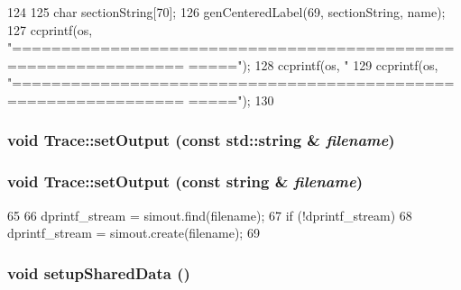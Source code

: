 \begin{DoxyCode}
124 {
125     char sectionString[70];
126     genCenteredLabel(69, sectionString, name);
127     ccprintf(os, "===============================================================
      =====\n");
128     ccprintf(os, "%
129     ccprintf(os, "===============================================================
      =====\n");
130 }
\end{DoxyCode}
\hypertarget{namespaceTrace_a328abf4c8a23042eb4edd3b0807b81ab}{
\subsubsection[{setOutput}]{\setlength{\rightskip}{0pt plus 5cm}void Trace::setOutput (const std::string \& {\em filename})}}
\label{namespaceTrace_a328abf4c8a23042eb4edd3b0807b81ab}
\hypertarget{namespaceTrace_ae05e11a017b6a616b42b8466c09a5dd1}{
\subsubsection[{setOutput}]{\setlength{\rightskip}{0pt plus 5cm}void Trace::setOutput (const string \& {\em filename})}}
\label{namespaceTrace_ae05e11a017b6a616b42b8466c09a5dd1}



\begin{DoxyCode}
65 {
66     dprintf_stream = simout.find(filename);
67     if (!dprintf_stream)
68         dprintf_stream = simout.create(filename);
69 }
\end{DoxyCode}
\hypertarget{namespaceTrace_a577907a8a8a528fe0e43d77c4123492d}{
\subsubsection[{setupSharedData}]{\setlength{\rightskip}{0pt plus 5cm}void setupSharedData ()}}
\label{namespaceTrace_a577907a8a8a528fe0e43d77c4123492d}


